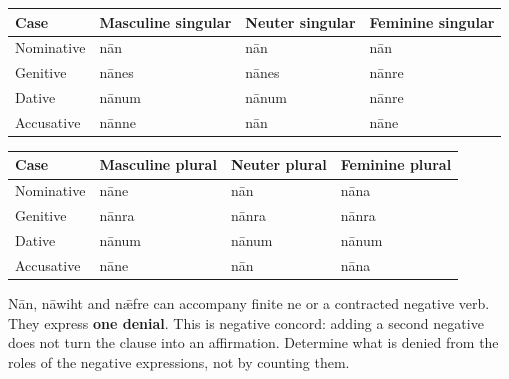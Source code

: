 \par\begingroup
\fontsize{10.5}{13.2}\selectfont
\setlength{\LTleft}{0pt}\setlength{\LTright}{\fill}
\noindent
\begin{tabular}{@{}>{\raggedright\arraybackslash}p{22.0mm}>{\raggedright\arraybackslash}p{31.188mm}>{\raggedright\arraybackslash}p{31.188mm}>{\raggedright\arraybackslash}p{31.188mm}@{}}
\toprule
\textbf{Case} & \textbf{Masculine singular} & \textbf{Neuter singular} & \textbf{Feminine singular} \\
\midrule
Nominative & nān & nān & nān \\
Genitive & nānes & nānes & nānre \\
Dative & nānum & nānum & nānre \\
Accusative & nānne & nān & nāne \\
\bottomrule
\end{tabular}
\par\endgroup
\par\addvspace{5pt}
\par\begingroup
\fontsize{10.5}{13.2}\selectfont
\setlength{\LTleft}{0pt}\setlength{\LTright}{\fill}
\noindent
\begin{tabular}{@{}>{\raggedright\arraybackslash}p{22.0mm}>{\raggedright\arraybackslash}p{31.188mm}>{\raggedright\arraybackslash}p{31.188mm}>{\raggedright\arraybackslash}p{31.188mm}@{}}
\toprule
\textbf{Case} & \textbf{Masculine plural} & \textbf{Neuter plural} & \textbf{Feminine plural} \\
\midrule
Nominative & nāne & nān & nāna \\
Genitive & nānra & nānra & nānra \\
Dative & nānum & nānum & nānum \\
Accusative & nāne & nān & nāna \\
\bottomrule
\end{tabular}
\par\endgroup

Nān, nāwiht and nǣfre can accompany finite ne or a contracted negative verb. They express \textbf{one denial}. This is negative concord: adding a second negative does not turn the clause into an affirmation. Determine what is denied from the roles of the negative expressions, not by counting them.

